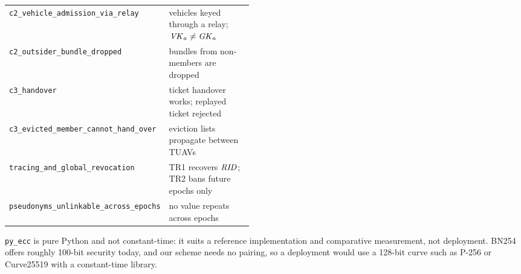 \begin{table}[H]
\begin{tabularx}{\linewidth}{@{}>{\raggedright\arraybackslash}p{0.47\linewidth}>{\raggedright\arraybackslash}X@{}}
\texttt{c2\_vehicle\_admission\_via\_relay} & vehicles keyed through a relay; $\mathit{VK}_a\neq\mathit{GK}_a$\\
\texttt{c2\_outsider\_bundle\_dropped} & bundles from non-members are dropped\\
\texttt{c3\_handover} & ticket handover works; replayed ticket rejected\\
\texttt{c3\_evicted\_member\_cannot\_hand\_over} & eviction lists propagate between TUAVs\\
\texttt{tracing\_and\_global\_revocation} & TR1 recovers $\mathit{RID}$; TR2 bans future epochs only\\
\texttt{pseudonyms\_unlinkable\_across\_epochs} & no value repeats across epochs\\
\bottomrule
\end{tabularx}
\end{table}

\begin{limitbox}
\texttt{py\_ecc} is pure Python and not constant-time: it suits a reference implementation and comparative measurement, not deployment. BN254 offers roughly
100-bit security today, and our scheme needs no pairing, so a deployment would use a 128-bit curve such as P-256 or Curve25519 with a constant-time library.
\end{limitbox}
